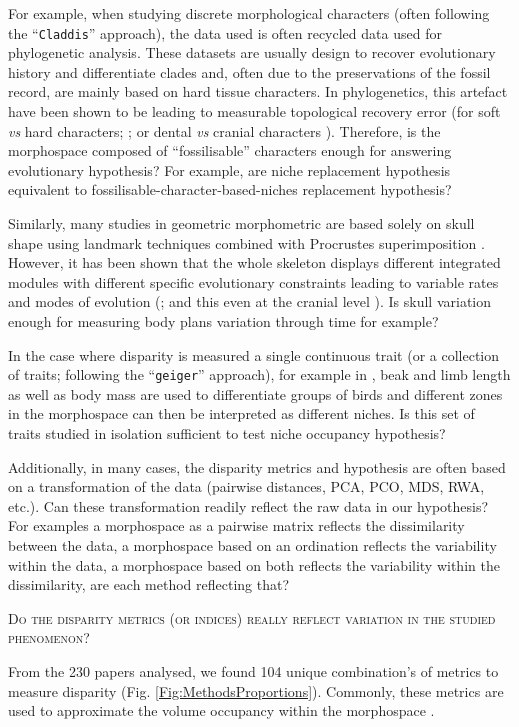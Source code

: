 \documentclass[12pt,letterpaper]{article}
\renewcommand{\section}[1]{%
\bigskip
\begin{center}
\begin{Large}
\normalfont\scshape #1
\medskip
\end{Large}
\end{center}}
\begin{document}
For example, when studying discrete morphological characters (often following the ``\texttt{Claddis}'' approach), the data used is often recycled data used for phylogenetic analysis.
These datasets are usually design to recover evolutionary history and differentiate clades and, often due to the preservations of the fossil record, are mainly based on hard tissue characters.
In phylogenetics, this artefact have been shown to be leading to measurable topological recovery error (for soft \textit{vs} hard characters; \citealt{sansomfossilization2013}; or dental \textit{vs} cranial characters \citealt{sansom2017dental}).
Therefore, is the morphospace composed of ``fossilisable'' characters enough for answering evolutionary hypothesis?
For example, are niche replacement hypothesis equivalent to fossilisable-character-based-niches replacement hypothesis?

Similarly, many studies in geometric morphometric are based solely on skull shape using landmark techniques combined with Procrustes superimposition \citep[the ``\texttt{geomorph}'' approach;][]{zelditch2012geometric,adams2017geometric}.
However, it has been shown that the whole skeleton displays different integrated modules with different specific evolutionary constraints leading to variable rates and modes of evolution (\citealt{Goswami20130254}; and this even at the cranial level \citealt{goswami2010influence}).
Is skull variation enough for measuring body plans variation through time for example?

In the case where disparity is measured a single continuous trait (or a collection of traits; following the ``\texttt{geiger}'' approach), for example in \cite{price2014niche}, beak and limb length as well as body mass are used to differentiate groups of birds and different zones in the morphospace can then be interpreted as different niches.
Is this set of traits studied in isolation sufficient to test niche occupancy hypothesis?

Additionally, in many cases, the disparity metrics and hypothesis are often based on a transformation of the data (pairwise distances, PCA, PCO, MDS, RWA, etc.).
Can these transformation readily reflect the raw data in our hypothesis?
For examples a morphospace as a pairwise matrix reflects the dissimilarity between the data, a morphospace based on an ordination reflects the variability within the data, a morphospace based on both reflects the variability within the dissimilarity, are each method reflecting that?

\section{Do the disparity metrics (or indices) really reflect variation in the studied phenomenon?}
From the 230 papers analysed, we found 104 unique combination's of metrics to measure disparity (Fig. \ref{Fig:MethodsProportions}).
Commonly, these metrics are used to approximate the volume occupancy within the morphospace \citep{Wills2001,DonohueDim,diaz2016global}.
\end{document}
